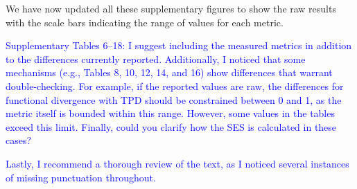\documentclass[
]{article}
\begin{document}
We have now updated all these supplementary figures to show the raw results with the scale bars indicating the range of values for each metric.

\textcolor{blue}{Supplementary Tables 6–18: I suggest including the measured metrics in addition to the differences currently reported.
Additionally, I noticed that some mechanisms (e.g., Tables 8, 10, 12, 14, and 16) show differences that warrant double-checking.
For example, if the reported values are raw, the differences for functional divergence with TPD should be constrained between 0 and 1, as the metric itself is bounded within this range.
However, some values in the tables exceed this limit.
Finally, could you clarify how the SES is calculated in these cases?}


\textcolor{blue}{Lastly, I recommend a thorough review of the text, as I noticed several instances of missing punctuation throughout.}
\end{document}
